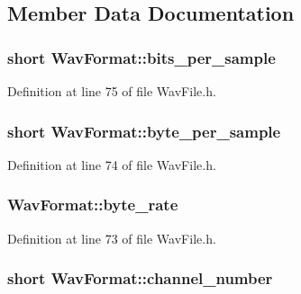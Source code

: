 \subsection{Member Data Documentation}
\subsubsection[{\texorpdfstring{bits\+\_\+per\+\_\+sample}{bits_per_sample}}]{\setlength{\rightskip}{0pt plus 5cm}short Wav\+Format\+::bits\+\_\+per\+\_\+sample}\hypertarget{struct_wav_format_a52b9a67e1620c5385e0b413601aeb55b}{}\label{struct_wav_format_a52b9a67e1620c5385e0b413601aeb55b}


Definition at line 75 of file Wav\+File.\+h.

\subsubsection[{\texorpdfstring{byte\+\_\+per\+\_\+sample}{byte_per_sample}}]{\setlength{\rightskip}{0pt plus 5cm}short Wav\+Format\+::byte\+\_\+per\+\_\+sample}\hypertarget{struct_wav_format_a431018caa2aa6b501014bdac4d40c8b7}{}\label{struct_wav_format_a431018caa2aa6b501014bdac4d40c8b7}


Definition at line 74 of file Wav\+File.\+h.

\subsubsection[{\texorpdfstring{byte\+\_\+rate}{byte_rate}}]{ Wav\+Format\+::byte\+\_\+rate}\hypertarget{struct_wav_format_a9059b9e3a6c4bef59b9557f801040f92}{}\label{struct_wav_format_a9059b9e3a6c4bef59b9557f801040f92}


Definition at line 73 of file Wav\+File.\+h.

\subsubsection[{\texorpdfstring{channel\+\_\+number}{channel_number}}]{\setlength{\rightskip}{0pt plus 5cm}short Wav\+Format\+::channel\+\_\+number}\hypertarget{struct_wav_format_a646d8221763d5e1c43a7811a5789296d}{}\label{struct_wav_format_a646d8221763d5e1c43a7811a5789296d}



